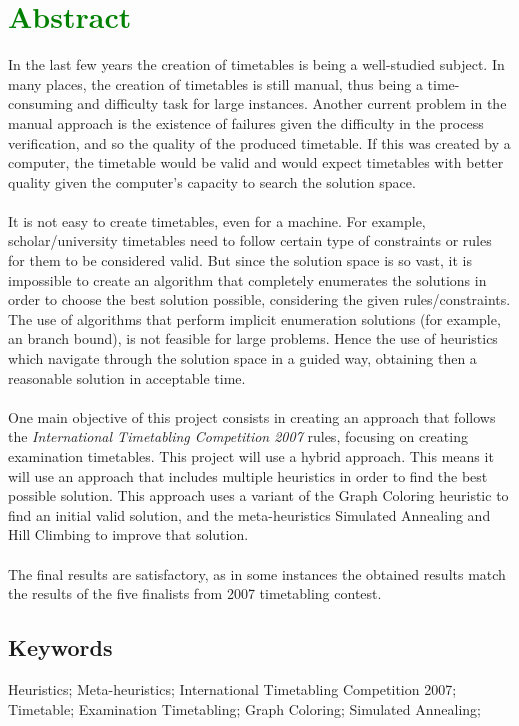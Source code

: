 \chapter*{\textcolor{green}{Abstract}}

In the last few years the creation of timetables is being a well-studied subject. In many places, the creation of timetables is still manual, thus being a time-consuming and difficulty task for large instances. Another current problem in the manual approach is the existence of failures given the difficulty in the process verification, and so the quality of the produced timetable. If this was created by a computer, the timetable would be valid and would expect timetables with better quality given the computer's capacity to search the solution space. \\
\\
It is not easy to create timetables, even for a machine. For example, scholar/university timetables need to follow certain type of constraints or rules for them to be considered valid. But since the solution space is so vast, it is impossible to create an algorithm that completely enumerates the solutions in order to choose the best solution possible, considering the given rules/constraints. The use of algorithms that perform implicit enumeration solutions (for example, an branch bound), is not feasible for large problems. Hence the use of heuristics which navigate through the solution space in a guided way, obtaining then a reasonable solution in acceptable time.\\
\\
One main objective of this project consists in creating an approach that follows the \textit{International Timetabling Competition 2007} rules, focusing on creating examination timetables. This project will use a hybrid approach. This means it will use an approach that includes multiple heuristics in order to find the best possible solution. This approach uses a variant of the Graph Coloring heuristic to find an initial valid solution, and the meta-heuristics Simulated Annealing and Hill Climbing to improve that solution.\\
\\
The final results are satisfactory, as in some instances the obtained results match the results of the five finalists from 2007 timetabling contest.


\section*{Keywords}

Heuristics; Meta-heuristics; International Timetabling Competition 2007; Timetable; Examination Timetabling; Graph Coloring; Simulated Annealing;

